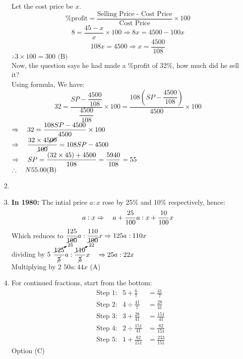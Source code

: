 \begin{multicols}{2}
\begin{enumerate}[label={\arabic*.}]
    Let the cost price be \(x\).
    \[ \%\text{profit} = \frac{\text{Selling Price - Cost Price} }{\text{Cost Price}} \times 100 \]
       \[8 = \frac{45 - x}{x} \times 100 \Rightarrow 8x = 4500 -100x\]
       \[108x = 4500 \Rightarrow x = \dfrac{4500}{108}\]
       \(\therefore 3 \times 100 = 300 \text{ (B)}\)\\
       Now, the question says he had made a \%profit of 32\%, how much did he sell it? \\
       Using formula, We have: 
       \[32 = \frac{SP - \dfrac{4500}{108}}{\dfrac{4500}{108}} \times 100 =  \frac{108\left(SP - \dfrac{4500}{108}\right)}{4500} \times 100\]
       \(\Rightarrow \hspace {10px} 32 =  \dfrac{108SP - 4500}{4500} \times 100 \) \\
       \(\Rightarrow \hspace{10px} \dfrac{32 \times 45\cancel{00}}{\cancel{100}} = 108SP - 4500\) \\
       \(\Rightarrow  \hspace{10px} SP = \dfrac{\left(32 \times 45\right) + 4500}{108} = \dfrac{5940}{108} = 55\) \vspace{5px}\\
       \(\therefore \hspace{10px} N55.00 \text{(B)}\)

\item 

 \item \textbf{In 1980:} The intial price \(a : x\) rose by 25\% and 10\% respectively, hence:
    \[a:x \Rightarrow \hspace{10px} a + \dfrac{25}{100}a : x + \dfrac{10}{100}x\]
    Which reduces to \(\dfrac{125}{\cancel{100}}a : \dfrac{110}{\cancel{100}}x \Rightarrow {125}a : 110x  \) \vspace{5px} \\
    dividing by 5 \(\dfrac{\cancelto{25}{125}}{\cancel{5}} a : \dfrac{\cancelto{22}{110}}{\cancel{5}} x \hspace {10px}\Rightarrow 25a : 22x \) \vspace{5px}\\
    Multiplying by 2 \hspace{10px} \(50a : 44x\) \hspace{5px} (A)

\item For continued fractions, start from the bottom:
    \begin{align*}
    &\text{Step 1:} & 5 + \frac{6}{7} &= \frac{41}{7} \\
    &\text{Step 2:} & 4 \div \frac{41}{7} &= \frac{28}{41} \\
    &\text{Step 3:} & 3 + \frac{28}{41} &= \frac{151}{41} \\
    &\text{Step 4:} & 2 \div \frac{151}{41} &= \frac{82}{151} \\
    &\text{Step 5:} & 1 + \frac{82}{151} &= \frac{233}{151}
    \end{align*}
    Option (C)


\end{enumerate}
\end{multicols}
